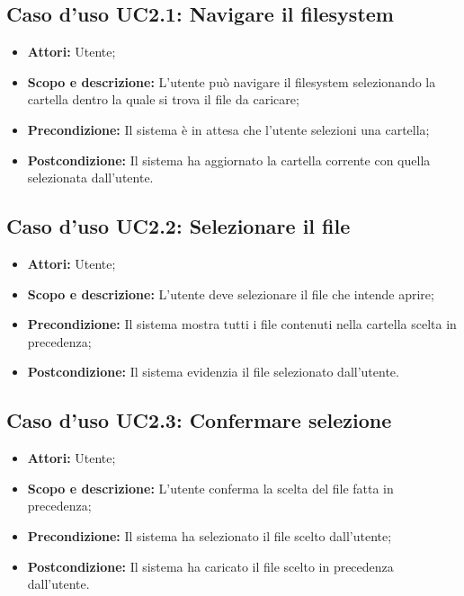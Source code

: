 \subsection{Caso d'uso UC2.1: Navigare il filesystem}
\begin{itemize}
	\item \textbf{Attori:} Utente;
	\item \textbf{Scopo e descrizione:} L'utente può navigare il \gls{filesystem} selezionando la cartella dentro la quale si trova il file da caricare;
	\item \textbf{Precondizione:} Il sistema è in attesa che l'utente selezioni una cartella;
	\item \textbf{Postcondizione:} Il sistema ha aggiornato la cartella corrente con quella selezionata dall'utente.
\end{itemize}

\subsection{Caso d'uso UC2.2: Selezionare il file}
\begin{itemize}
	\item \textbf{Attori:} Utente;
	\item \textbf{Scopo e descrizione:} L'utente deve selezionare il file che intende aprire;
	\item \textbf{Precondizione:} Il sistema mostra tutti i file contenuti nella cartella scelta in precedenza;
	\item \textbf{Postcondizione:} Il sistema evidenzia il file selezionato dall'utente.
\end{itemize}

\subsection{Caso d'uso UC2.3: Confermare selezione}
\begin{itemize}
	\item \textbf{Attori:} Utente;
	\item \textbf{Scopo e descrizione:} L'utente conferma la scelta del file fatta in precedenza;
	\item \textbf{Precondizione:} Il sistema ha selezionato il file scelto dall'utente;
	\item \textbf{Postcondizione:} Il sistema ha caricato il file scelto in precedenza dall'utente.
\end{itemize}